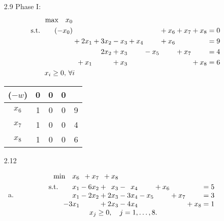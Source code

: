 \documentclass[a4paper,10pt]{article}
\theoremstyle{definition}
\begin{document}
\begin{enumerate}
\item[2.9]
Phase I:
\begin{align*}
  \begin{array}{r@{}r@{}r@{}r@{}r@{}r@{}r@{}r@{}r@{}l}
    \text{max} \quad x_0 &{}&{}\\[\jot]
    \text{s.t.}\qquad (-x_0) &{}&{}&{}&{}&{}&{}+x_6&{}+x_7&{}+x_8&{}=0\\[\jot]
    &{}+2x_1 &{}+3x_2&{}-x_3&{}+x_4 &{} &{} +x_6 &{} &{}&{}=9  \\[\jot]
    &{}&{}2x_2&{}+x_3&{} &{}-x_5 &{} &{}+x_7&{}&{} = 4 \\[\jot]
   &{}+x_1&{}&{}+x_3&{} &{}&{} &{}&{}+x_8&{}= 6 \\ [\jot]
     \multicolumn{2}{c}{x_i \geq 0,\, \forall i}
  \end{array}
\end{align*}
\begin{table}[h]
\centering
\begin{tabular}{c|ccc|c}
($-w$) & 0 & 0 & 0 & \\
\hline
$x_6$ & 1 & 0 & 0 & 9\\
$x_7$ & 1 & 0 & 0 & 4\\
$x_8$ & 1 & 0 & 0 & 6\\
\end{tabular}
\end{table}
\item[2.12]
\begin{enumerate}[(a)]
\item
\begin{align*}
  \begin{array}{r@{}r@{}r@{}r@{}r@{}r@{}r@{}r@{}l}
    \text{min} \quad x_6 &{} + x_7 &{} +x_8 \\[\jot]
    \text{s.t.}\qquad x_1 &{} -6x_2 &{} + \phantom{2}x_3 &{}- \phantom{3}x_4 &{}&{}+x_6&{}&{}&{}= 5 \\  
                           x_1 &{} -2x_2         &{} +   2x_3 &{}-3x_4&{} - x_5&{}&{}+x_7&{}&{} = 3 \\            
                     -3x_1 &{} &{}+2x_3&{}-4x_4    &{} &{}&{}&{}+x_8&{}= 1 \\         
 \multicolumn{8}{c}{x_j \geq 0, \quad j=1,\dots,8.}
  \end{array}
\end{align*}


\end{enumerate}
\end{enumerate}
\end{document}
